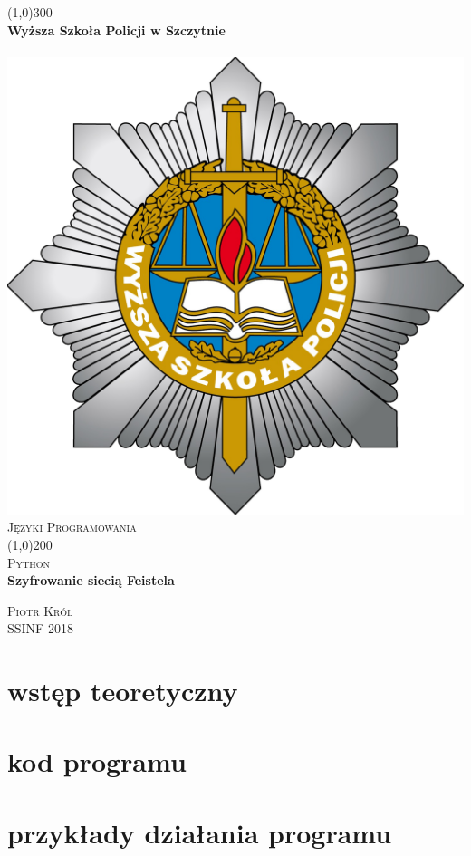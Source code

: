 \documentclass[11pt]{article}
\begin{document}
	\begin{titlepage}
		\begin{center}
		\line(1,0){300}\\
		[0,25in]
		\LARGE\textbf{Wyższa Szkoła Policji w Szczytnie}\\
	\hbox{\hspace{3.2em} \includegraphics[scale=0.3]{logo-WSPol.png}}
		\textsc{\LARGE Języki Programowania} \\
		[1mm]
		\line(1,0){200}\\
		[0.2cm]
		\textsc{\LARGE Python}\\
		[0.35cm]
		\huge{\bfseries Szyfrowanie siecią Feistela}\\
		[1.8cm]
		\end{center}
		\begin{flushright}
		\textsc{\large Piotr Król \\}
		SSINF 2018
		\end{flushright}
	\end{titlepage}
	
	\shipout\null

	\section{wstęp teoretyczny}
	\section{kod programu}
	\section{przykłady działania programu}
\end{document}
